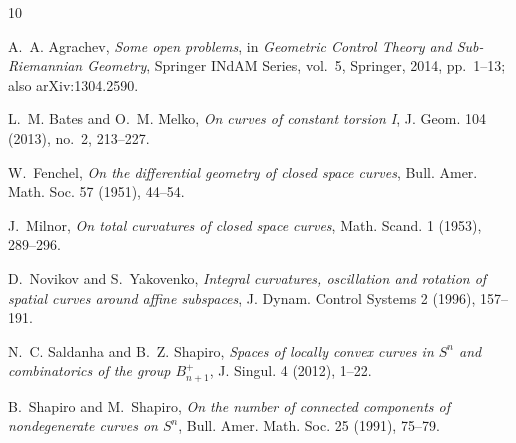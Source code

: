 \documentclass[11pt,reqno]{amsart}
\theoremstyle{definition}
\theoremstyle{remark}
\begin{document}
\begin{thebibliography}{10}

A.~A. Agrachev, \emph{Some open problems}, in \emph{Geometric Control Theory and
Sub-Riemannian Geometry}, Springer INdAM Series, vol.~5, Springer, 2014, pp.~1--13;
also arXiv:1304.2590.

L.~M. Bates and O.~M. Melko, \emph{On curves of constant torsion I}, J. Geom.
104 (2013), no.~2, 213--227.

W.~Fenchel, \emph{On the differential geometry of closed space curves}, Bull. Amer.
Math. Soc. 57 (1951), 44--54.

J.~Milnor, \emph{On total curvatures of closed space curves}, Math. Scand. 1
(1953), 289--296.

D.~Novikov and S.~Yakovenko, \emph{Integral curvatures, oscillation and rotation of
spatial curves around affine subspaces}, J. Dynam. Control Systems 2 (1996),
157--191.

N.~C. Saldanha and B.~Z. Shapiro, \emph{Spaces of locally convex curves in
$S^n$ and combinatorics of the group $B^+_{n+1}$}, J. Singul. 4 (2012), 1--22.

B.~Shapiro and M.~Shapiro, \emph{On the number of connected components of
nondegenerate curves on $S^n$}, Bull. Amer. Math. Soc. 25 (1991), 75--79.

\end{thebibliography}
\end{document}
